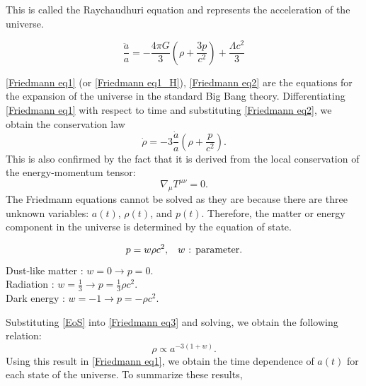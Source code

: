 \documentclass[12pt]{article}
\newcommand{\tcb}[2]{\begin{tcolorbox}[title={\textcolor{white}{#1}}, opacitybacktitle = 0, colframe=white!40!black]#2
\end{tcolorbox}}
\numberwithin{equation}{section}
\begin{document}
This is called the Raychaudhuri equation and represents the acceleration of the universe.
\tcb{Raychaudhuri equation (universe acceleration rate)}{
    \begin{equation}\label{Friedmann eq2}
        \frac{\ddot{a}}{a} = -\frac{4\pi G}{3}\left( \rho + \frac{3p}{c^2} \right) + \frac{\Lambda c^2}{3}
    \end{equation}
}
\eqref{Friedmann eq1} (or \eqref{Friedmann eq1_H}), \eqref{Friedmann eq2} are the equations for the expansion of the universe in the standard Big Bang theory. Differentiating \eqref{Friedmann eq1} with respect to time and substituting \eqref{Friedmann eq2}, we obtain the conservation law
\begin{equation}\label{Friedmann eq3}
    \dot{\rho} = -3\frac{\dot{a}}{a}\left( \rho + \frac{p}{c^2} \right).
\end{equation}
This is also confirmed by the fact that it is derived from the local conservation of the energy-momentum tensor:
\begin{equation}
    \nabla_\mu T^{\mu\nu} = 0.
\end{equation}
The Friedmann equations cannot be solved as they are because there are three unknown variables: $a(t)$, $\rho(t)$, and $p(t)$. Therefore, the matter or energy component in the universe is determined by the equation of state. 
\tcb{Equation of state}{
    \begin{equation}\label{EoS}
        p = w\rho c^2, \hspace{0.3cm} \textrm{$w$ : parameter}.
    \end{equation}
    \hspace{0.3cm} Dust-like matter : $w = 0 \to p=0$.\\
    \hspace{0.3cm} Radiation : $w = \displaystyle \frac{1}{3} \to p = \frac{1}{3}\rho c^2$.\\
    \hspace{0.3cm} Dark energy : $w = -1 \to p = -\rho c^2$.
}
Substituting \eqref{EoS} into \eqref{Friedmann eq3} and solving, we obtain the following relation:
\begin{equation}
    \rho \propto a^{-3(1 + w)}.
\end{equation}
Using this result in \eqref{Friedmann eq1}, we obtain the time dependence of $a(t)$ for each state of the universe. To summarize these results,
\end{document}
